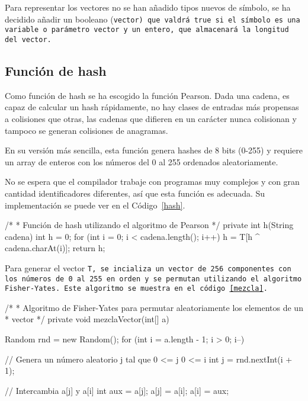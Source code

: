Para representar los vectores no se han añadido tipos nuevos de símbolo, se ha decidido añadir un booleano (\tt{vector}) que valdrá \tt{true} si el símbolo es una variable o parámetro vector y un entero, que almacenará la longitud del vector.

\subsection{Función de hash}
Como función de hash se ha escogido la función Pearson. Dada una cadena, es capaz de calcular un hash rápidamente, no hay clases de entradas más propensas a colisiones que otras, las cadenas que difieren en un carácter nunca colisionan y tampoco se generan colisiones de anagramas.

En su versión más sencilla, esta función genera hashes de 8 bits (0-255) y requiere un array de enteros con los números del 0 al 255 ordenados aleatoriamente.

No se espera que el compilador trabaje con programas muy complejos y con gran cantidad identificadores diferentes, así que esta función es adecuada. Su implementación se puede ver en el Código~\ref{hash}.

\begin{codigo}[style=java,caption={Función \url{lib.semantico.TablaSimbolos.h}.},label={hash}]
/*
 * Función de hash utilizando el algoritmo de Pearson
 */
private int h(String cadena) {
    int h = 0;
    for (int i = 0; i < cadena.length(); i++) {
        h = T[h ^ cadena.charAt(i)];
    }
    return h;
}
\end{codigo}

Para generar el vector \tt{T}, se incializa un vector de 256 componentes con los números de 0 al 255 en orden y se permutan utilizando el algoritmo Fisher-Yates. Este algoritmo se muestra en el código~\ref{mezcla}.

\begin{codigo}[style=java,caption={Función \url{lib.semantico.TablaSimbolos.mezclaVector}.},label={mezcla}]
/*
 * Algoritmo de Fisher-Yates para permutar aleatoriamente los elementos de un
 * vector
 */
private void mezclaVector(int[] a) {
    Random rnd = new Random();
    for (int i = a.length - 1; i > 0; i--) {
        // Genera un número aleatorio j tal que 0 <= j 0 <= i
        int j = rnd.nextInt(i + 1);

        // Intercambia a[j] y a[i]
        int aux = a[j];
        a[j] = a[i];
        a[i] = aux;
    }
}
\end{codigo}


